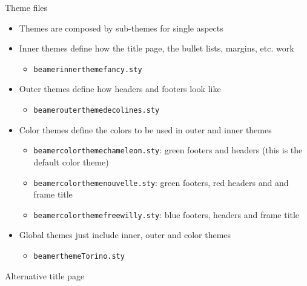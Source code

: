 \begin{frame}[t,fragile]{Theme files}
\begin{itemize}
\item Themes are composed by sub-themes for single aspects
\item Inner themes define how the title page, the bullet lists, margins,
      etc. work
  \begin{itemize}
    \item \verb!beamerinnerthemefancy.sty!
  \end{itemize}
\item Outer themes define how headers and footers look like
  \begin{itemize}
    \item \verb!beamerouterthemedecolines.sty!
  \end{itemize}
\item Color themes define the colors to be used in outer and inner themes
  \begin{itemize}
    \item \verb!beamercolorthemechameleon.sty!: green footers and headers
          (this is the default color theme)
    \item \verb!beamercolorthemenouvelle.sty!: green footers, red headers and
          and frame title
    \item \verb!beamercolorthemefreewilly.sty!: blue footers, headers and
          frame title
  \end{itemize}
\item Global themes just include inner, outer and color themes
  \begin{itemize}
    \item \verb!beamerthemeTorino.sty!
  \end{itemize}
\end{itemize}
\end{frame}

\begin{frame}[t,fragile]{Alternative title page}
\end{frame}

